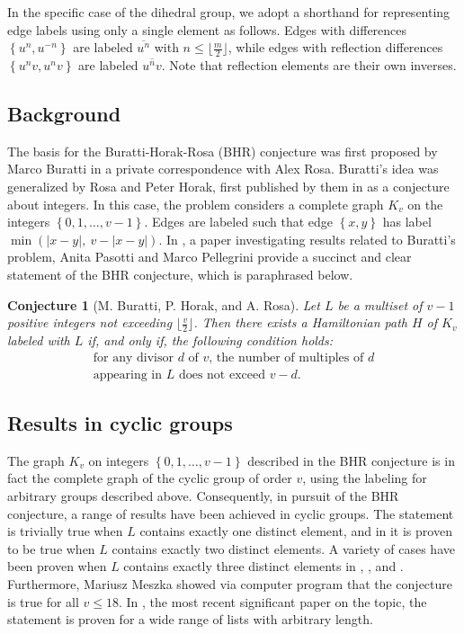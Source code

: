 \documentclass[12pt]{article}
\newtheorem{conj}[thm]{Conjecture}
\newcommand{\setof}[1]{\left\{#1\right\}}
\newcommand{\floor}[1]{\lfloor#1\rfloor}
\newcommand{\ol}[1]{\overline{#1}} %
\begin{document}
In the specific case of the dihedral group, we adopt
a shorthand for representing edge labels using only a
single element as follows. Edges with differences $\setof{u^n, u^{-n}}$ are
labeled $\ol{u^n}$ with $n \leq \floor{\frac{m}{2}}$, while edges
with reflection differences $\setof{u^nv, u^nv}$ are labeled $\ol{u^nv}$.
Note that reflection elements are their own inverses.

\subsection{Background}
The basis for the Buratti-Horak-Rosa (BHR) conjecture was first proposed by Marco Buratti
in a private correspondence with Alex Rosa. Buratti's idea was generalized
by Rosa and Peter Horak, first published by them in \cite{BHR} as a conjecture about integers.
In this case, the problem considers a complete graph $K_v$ on the integers $\setof{0, 1, \dots, v - 1}$.
Edges are labeled such that edge $\setof{x, y}$ has label $\min(|x - y|,\ v - |x - y|)$.
In \cite{NewResult},
a paper investigating results related to Buratti's problem, Anita Pasotti and Marco Pellegrini
provide a succinct and clear statement of the BHR conjecture, which is paraphrased below.

\begin{conj}[M. Buratti, P. Horak, and A. Rosa]\label{BHR}
  Let $L$ be a multiset of $v-1$ positive integers
  not exceeding $\floor{\frac{v}{2}}$. Then there exists a Hamiltonian path $H$ of
  $K_v$ labeled with $L$ if, and only if, the following condition holds:
  \begin{equation}\label{BHRcondition}
    \left. \begin{array}{c}
      \textrm{for any divisor $d$ of $v$, the number of multiples of $d$} \\
      \textrm{appearing in $L$ does not exceed $v-d$.}
    \end{array}\right.
  \end{equation}
\end{conj}

\subsection{Results in cyclic groups}
The graph $K_v$ on integers $\setof{0, 1, \dots, v-1}$ described in the BHR conjecture is in
fact the complete graph of the cyclic group of order $v$, using the labeling for arbitrary groups
described above.
Consequently, in pursuit of the BHR conjecture, a range of results have been achieved in cyclic groups.
The statement is trivially true when $L$ contains exactly one distinct element, and in \cite{BHR} it is proven
to be true when $L$ contains exactly two distinct elements. A variety of cases have been proven when
$L$ contains exactly three distinct elements in \cite{123}, \cite{NewResult}, and \cite{OnBHR}.
Furthermore, Mariusz Meszka showed via computer program that the conjecture is true for all $v \leq 18$.
In \cite{NewMethods}, the most recent significant paper on the topic, the statement is proven for
a wide range of lists with arbitrary length.
\end{document}
